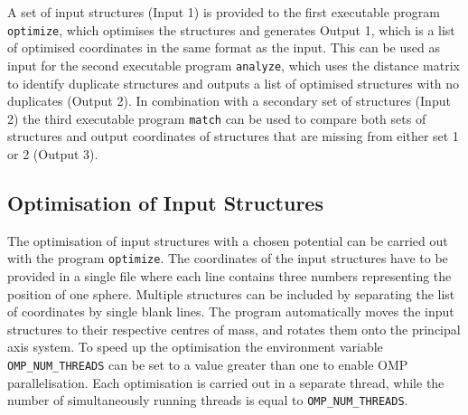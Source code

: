 %
A set of input structures (Input 1) is provided to the first executable program
\texttt{optimize}, which optimises the structures and generates Output 1, which
is a list of optimised coordinates in the same format as the input. This can be
used as input for the second executable program \texttt{analyze}, which uses
the distance matrix to identify duplicate structures and outputs a list of
optimised structures with no duplicates (Output 2). In combination with a
secondary set of structures (Input 2) the third executable program
\texttt{match} can be used to compare both sets of structures and output
coordinates of structures that are missing from either set 1 or 2 (Output 3). 

\subsection{Optimisation of Input Structures}
\label{sec:optimisationofinputstructures}

The optimisation of input structures with a chosen potential can be carried out
with the program \texttt{optimize}. The coordinates of the input structures have
to be provided in a single file where each line contains three numbers
representing the position of one sphere. Multiple structures can be included by
separating the list of coordinates by single blank lines. The program
automatically moves the input structures to their respective centres of mass,
and rotates them onto the principal axis system. To speed up the optimisation
the environment variable \texttt{OMP\_NUM\_THREADS} can be set to a value
greater than one to enable \ac{OMP} parallelisation. Each optimisation is
carried out in a separate thread, while the number of simultaneously running
threads is equal to \texttt{OMP\_NUM\_THREADS}.

